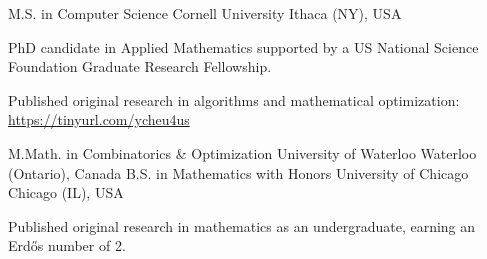 

\begin{cventries}

  \cventry
    {M.S. in Computer Science} %
    {Cornell University} %
    {Ithaca (NY), USA} %
    {} %
    {
      \begin{cvitems} %
        \item {PhD candidate in Applied Mathematics supported by a US National Science Foundation Graduate Research Fellowship.}
        \item {Published original research in algorithms and mathematical optimization: \url{https://tinyurl.com/ycheu4us}}
      \end{cvitems}
    }

  \cventry
    {M.Math. in Combinatorics \& Optimization} %
    {University of Waterloo} %
    {Waterloo (Ontario), Canada} %
    {} %
    {}
  \vspace{-1.0mm}
  \cventry
    {B.S. in Mathematics with Honors} %
    {University of Chicago} %
    {Chicago (IL), USA} %
    {} %
    {
      \begin{cvitems} %
        \item {Published original research in mathematics as an undergraduate, earning an Erd\H{o}s number of 2.}
      \end{cvitems}
    }
  \vspace{-1.0mm}
\end{cventries}
